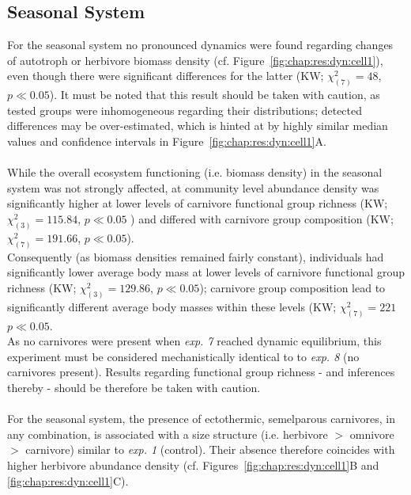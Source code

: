 \subsection{Seasonal System}
\label{chap:res:popind:cell1}
 For the seasonal system no pronounced dynamics were found regarding changes of autotroph or herbivore biomass density (cf. Figure~\ref{fig:chap:res:dyn:cell1}), even though there were significant differences for the latter (KW; $\chi^{2}_{(7)} = 48$, $p \ll 0.05$). It must be noted that this result should be taken with caution, as tested groups were inhomogeneous regarding their distributions; detected differences may be over-estimated, which is hinted at by highly similar median values and confidence intervals in Figure~\ref{fig:chap:res:dyn:cell1}A.
\\\\
While the overall ecosystem functioning (i.e. biomass density) in the seasonal system was not strongly affected, at community level abundance density was significantly higher at lower levels of carnivore functional group richness (KW; $\chi^{2}_{(3)} = 115.84$, $p \ll 0.05$ ) and differed  with carnivore group composition (KW; $\chi^{2}_{(7)} = 191.66$, $p \ll 0.05$).
\\ 
Consequently (as biomass densities remained fairly constant), individuals had significantly lower average body mass at lower levels of carnivore functional group richness (KW; $\chi^{2}_{(3)} = 129.86$, $p \ll 0.05$); carnivore group composition lead to significantly different average body masses within these levels (KW; $\chi^{2}_{(7)} = 221$ $p \ll 0.05$. \\
As no carnivores were present when \textit{exp. 7} reached dynamic equilibrium, this experiment must be considered mechanistically identical to to \textit{exp. 8} (no carnivores present). Results  regarding functional group richness - and inferences thereby - should be therefore be taken with caution.\\\\
For the seasonal system, the presence of ectothermic, semelparous carnivores, in any combination, is associated with a size structure (i.e. herbivore $>$ omnivore $>$ carnivore) similar to \textit{exp. 1} (control). Their absence therefore coincides with higher herbivore abundance density (cf. Figures~\ref{fig:chap:res:dyn:cell1}B and \ref{fig:chap:res:dyn:cell1}C).
 
 

